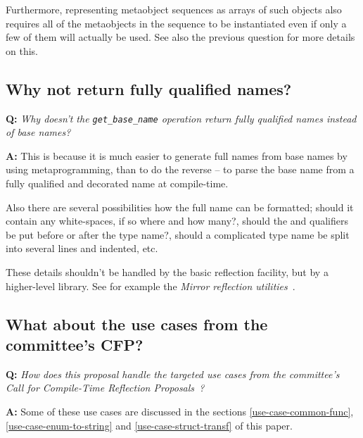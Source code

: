Furthermore, representing metaobject sequences as arrays of such \verb@constexpr@
objects also requires all of the metaobjects in the sequence to be instantiated
even if only a few of them will actually be used. See also the previous
question for more details on this.

\subsection{Why not return fully qualified names?}

\textbf{Q:} {\em Why doesn't the \texttt{get\_base\_name} operation return fully
qualified names instead of base names?}

\textbf{A:} This is because it is much easier to generate full names from
base names by using metaprogramming, than to do the reverse -- to parse the
base name from a fully qualified and decorated name at compile-time.

Also there are several possibilities how the full name can be formatted;
should it contain any white-spaces, if so where and how many?, should the
\verb@const@ and \verb@volatile@ qualifiers be put before or after the type
name?, should a complicated type name be split into several lines and indented, etc.

These details shouldn't be handled by the basic reflection facility, but by
a higher-level library. See for example the
{\em Mirror reflection utilities}~\cite{Chochlik-Mirror-new-doc}.

\subsection{What about the use cases from the committee's CFP?}

\textbf{Q:} {\em How does this proposal handle the targeted use cases
from the committee's Call for Compile-Time Reflection
Proposals~\cite{ISOCPP-N3814}?}

\textbf{A:} Some of these use cases are discussed in the sections
\ref{use-case-common-func}, \ref{use-case-enum-to-string}
and \ref{use-case-struct-transf} of this paper.

